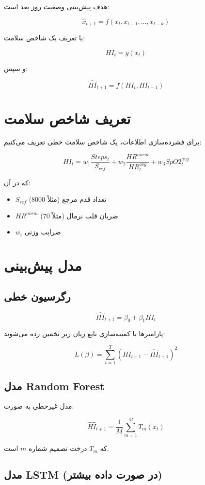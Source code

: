 \documentclass[12pt,a4paper]{article}
\begin{document}
	هدف پیش‌بینی وضعیت روز بعد است:
	
	\[
	\hat{x}_{t+1} = f(x_t, x_{t-1}, \dots, x_{t-k})
	\]
	
	یا تعریف یک شاخص سلامت:
	
	\[
	HI_t = g(x_t)
	\]
	
	و سپس:
	
	\[
	\hat{HI}_{t+1} = f(HI_t, HI_{t-1})
	\]
	
	\section{تعریف شاخص سلامت}
	
	برای فشرده‌سازی اطلاعات، یک شاخص سلامت خطی تعریف می‌کنیم:
	
	\[
	HI_t = w_1 \frac{Steps_t}{S_{ref}} 
	+ w_2 \frac{HR^{norm}}{HR^{avg}_t}
	+ w_3 SpO2^{avg}_t
	\]
	
	که در آن:
	
	\begin{itemize}
		\item $S_{ref}$ تعداد قدم مرجع (مثلاً 8000)
		\item $HR^{norm}$ ضربان قلب نرمال (مثلاً 70)
		\item $w_i$ ضرایب وزنی
	\end{itemize}
	
	\section{مدل پیش‌بینی}
	
	\subsection{رگرسیون خطی}
	
	\[
	\hat{HI}_{t+1} = \beta_0 + \beta_1 HI_t
	\]
	
	پارامترها با کمینه‌سازی تابع زیان زیر تخمین زده می‌شوند:
	
	\[
	L(\beta) = \sum_{t=1}^{T} (HI_{t+1} - \hat{HI}_{t+1})^2
	\]
	
	\subsection{مدل Random Forest}
	
	مدل غیرخطی به صورت:
	
	\[
	\hat{HI}_{t+1} = \frac{1}{M} \sum_{m=1}^{M} T_m(x_t)
	\]
	
	که $T_m$ درخت تصمیم شماره $m$ است.
	
	\subsection{مدل LSTM (در صورت داده بیشتر)}
	
\end{document}

